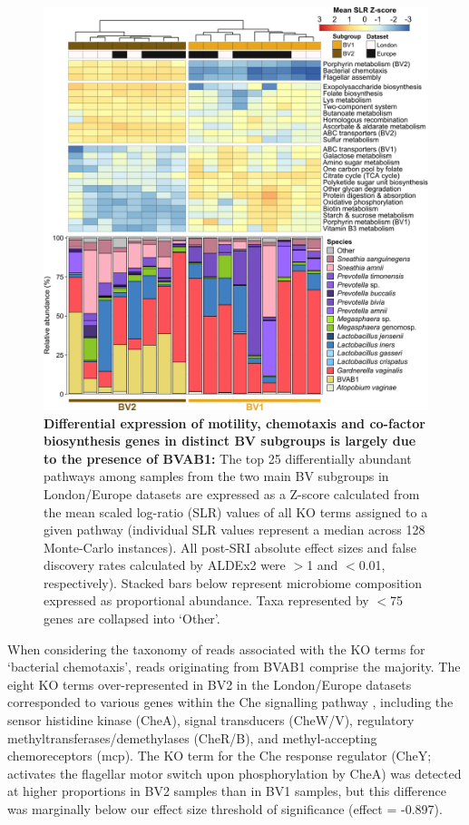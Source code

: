 \documentclass[sn-mathphys,Numbered]{sn-jnl}%
\begin{document}
\begin{figure}[H]
    \centering
    \includegraphics[scale=1.2]{0_multipanel_fig3.png}
    \caption{\textbf{Differential expression of motility, chemotaxis and co-factor biosynthesis genes in distinct BV subgroups is largely due to the presence of BVAB1:} The top 25 differentially abundant pathways among samples from the two main BV subgroups in London/Europe datasets are expressed as a Z-score calculated from the mean scaled log-ratio (SLR) values of all KO terms assigned to a given pathway (individual SLR values represent a median across 128 Monte-Carlo instances). All post-SRI absolute effect sizes and false discovery rates calculated by ALDEx2 were $>$1 and $<$0.01, respectively). Stacked bars below represent microbiome composition expressed as proportional abundance. Taxa represented by $<$75 genes are collapsed into `Other'.}
    \label{fig:figLonEurBVsubG}
\end{figure}

When considering the taxonomy of reads associated with the KO terms for `bacterial chemotaxis', reads originating from BVAB1 comprise the majority. The eight KO terms over-represented in BV2 in the London/Europe datasets corresponded to various genes within the Che signalling pathway \citep{miller_diversity_2009}, including the sensor histidine kinase (CheA), signal transducers (CheW/V), regulatory methyltransferases/demethylases (CheR/B), and methyl-accepting chemoreceptors (mcp). The KO term for the Che response regulator (CheY; activates the flagellar motor switch upon phosphorylation by CheA) was detected at higher proportions in BV2 samples than in BV1 samples, but this difference was marginally below our effect size threshold of significance (effect = -0.897).
\end{document}

